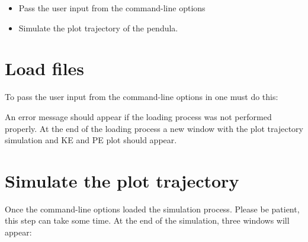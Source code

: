 \documentclass[12pt, titlepage]{article}
\begin{document}
\begin{itemize}
\item %
Pass the user input from the command-line options
\item %
Simulate the plot trajectory of the pendula.
\end{itemize}




\section{Load files}

To pass the user input from the command-line options in \progname{} 
one must do this:

An error message should appear if the loading process was not 
performed properly. At the end of the loading process a new window with the 
plot trajectory simulation and KE and PE plot should appear.




\section{Simulate the plot trajectory}

Once the command-line options loaded the simulation process. 
Please be patient, this step can take some time. 
At the end of the simulation, three windows will appear:
\end{document}
